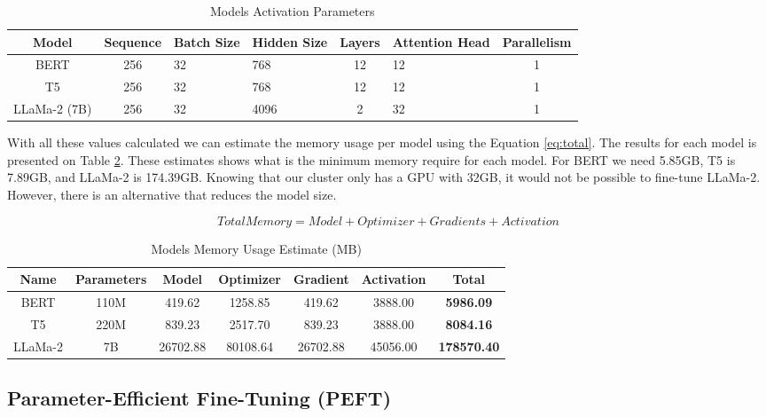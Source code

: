 \begin{table}[H]
	\centering
	\caption{Models Activation Parameters}
	\begin{tabular}{||c | c | p{1.5cm} | p{1.5cm} | c | p{2cm} | c||} 
		\hline
		\textbf{Model} & \textbf{Sequence} & \textbf{Batch Size} & \textbf{Hidden Size} & \textbf{Layers} & \textbf{Attention Head} & \textbf{Parallelism} \\ [1ex] 
		\hline
		BERT & 256 & 32 & 768 & 12 & 12 & 1 \\ [1ex]
		\hline
		T5 & 256 & 32 & 768 & 12 & 12 & 1  \\[1ex]
		\hline
		LLaMa-2 (7B) & 256 & 32 & 4096 & 2 & 32 & 1  \\[1ex]
		\hline
	\end{tabular}
	\label{table:ModelActivation}
\end{table}


With all these values calculated we can estimate the memory usage per model using the Equation \ref{eq:total}. The results for each model is presented on Table \ref{table:MemoryUsage}. These estimates shows what is the minimum memory require for each model. For BERT we need 5.85GB, T5 is 7.89GB, and LLaMa-2 is 174.39GB. Knowing that our cluster only has a GPU with 32GB, it would not be possible to fine-tune LLaMa-2. However, there is an alternative that reduces the model size. 
	
\[ Total Memory = Model + Optimizer + Gradients + Activation \label{eq:total} \tag{5} \] 

\begin{table}[H]
	\centering
	\caption{Models Memory Usage Estimate (MB)}
	\begin{tabular}{||c | c | c | c | c | c | c||} 
		\hline
		\textbf{Name} & \textbf{Parameters} & \textbf{Model} & \textbf{Optimizer} & \textbf{Gradient} & \textbf{Activation} & \textbf{Total} \\ [1ex] 
		\hline
		BERT & 110M & 419.62 & 1258.85 & 419.62 & 3888.00 & \textbf{5986.09} \\ [1ex]
		\hline
		T5 & 220M & 839.23 & 2517.70 & 839.23 & 3888.00 & \textbf{8084.16}  \\[1ex]
		\hline
		LLaMa-2 & 7B & 26702.88 & 80108.64 & 26702.88 & 45056.00 & \textbf{178570.40}  \\[1ex]
		\hline
	\end{tabular}
	\label{table:MemoryUsage}
\end{table}

\subsection{Parameter-Efficient Fine-Tuning (PEFT)}


